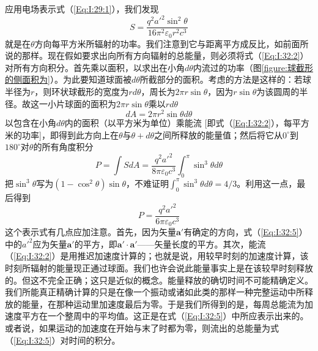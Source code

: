 应用电场表示式（\ref{Eq:I:29:1}），我们发现
\begin{equation}
    \label{Eq:I:32:2}
    S = \frac{q^2a'^2\sin^2\theta}{16\pi^2\varepsilon_0r^2c^3}
\end{equation}
就是在$\theta$方向每平方米所辐射的功率。我们注意到它与距离平方成反比，如前面所说的那样。现在假如要求出向所有方向辐射的总能量，则必须将式（\ref{Eq:I:32:2}）对所有方向积分。首先乘以面积，以求出在小角$d\theta$内流过的功率（图\ref{figure:球截形的侧面积为}）。为此要知道球面被$d\theta$所截部分的面积。考虑的方法是这样的：若球半径为$r$，则环状球截形的宽度为$rd\theta$，周长为$2\pi r\sin\theta$，因为$r\sin\theta$为该圆周的半径。故这一小片球面的面积为$2\pi r\sin\theta$乘以$rd\theta$
\begin{equation}
    \label{Eq:I:32:3}
    dA=2\pi r^2\sin\theta d\theta
\end{equation}
以包含在小角$d\theta$内的面积（以平方米为单位）乘能流 [即式（\ref{Eq:I:32:2}），每平方米的功率]，即得到此方向上在$\theta$与$\theta+d\theta$之间所释放的能量值；然后将它从$0^\circ$到$180^\circ$对$\theta$的所有角度积分
\begin{equation}
    \label{Eq:I:32:4}
    P = \int SdA = \frac{q^2a'^2}{8\pi\varepsilon_0c^3}\int_0^\pi \sin^3\theta d\theta
\end{equation}
把$\sin^3\theta$写为$(1-\cos^2\theta)\sin\theta$，不难证明$\int_0^\pi \sin^3\theta d\theta=4/3$。利用这一点，最后得到
\begin{equation}
    \label{Eq:I:32:5}
    P = \frac{q^2a'^2}{6\pi\varepsilon_0c^3}
\end{equation}
这个表示式有几点应加注意。首先，因为矢量$\boldsymbol{a}'$有确定的方向，式（\ref{Eq:I:32:5}）中的$a'^2$应为矢量$\boldsymbol{a}'$的平方，即$\boldsymbol{a}' \cdot \boldsymbol{a}'$——矢量长度的平方。其次，能流（\ref{Eq:I:32:2}）是用推迟加速度计算的；也就是说，用较早时刻的加速度计算，该时刻所辐射的能量现正通过球面。我们也许会说此能量事实上是在该较早时刻释放的。但这不完全正确；这只是近似的概念。能量释放的确切时间不可能精确定义。我们所能真正精确计算的只是在像一个振动或诸如此类的那样一种完整运动中所释放的能量，在那种运动里加速度最后为零。于是我们所得到的是，每周总能流为加速度平方在一个整周中的平均值。这正是在式（\ref{Eq:I:32:5}）中所应表示出来的。或者说，如果运动的加速度在开始与末了时都为零，则流出的总能量为式（\ref{Eq:I:32:5}）对时间的积分。

